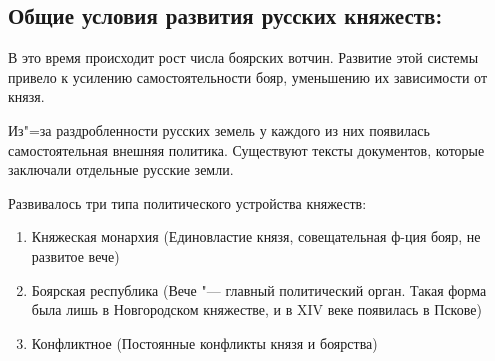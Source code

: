 \subsection{Общие условия развития русских княжеств:}

В это время происходит рост числа боярских вотчин. Развитие этой системы привело к усилению самостоятельности бояр, уменьшению их зависимости от князя.

Из"=за раздробленности русских земель у каждого из них появилась самостоятельная внешняя политика. Существуют тексты документов, которые заключали отдельные русские земли.

Развивалось три типа политического устройства княжеств:

\begin{enumerate}
    \item{ Княжеская монархия (Единовластие князя, совещательная ф-ция бояр, не развитое вече)}
    \item{ Боярская республика (Вече "--- главный политический орган. Такая форма была лишь в Новгородском княжестве, и в XIV веке появилась в Пскове)}
    \item{ Конфликтное (Постоянные конфликты князя и боярства)}
\end{enumerate}
